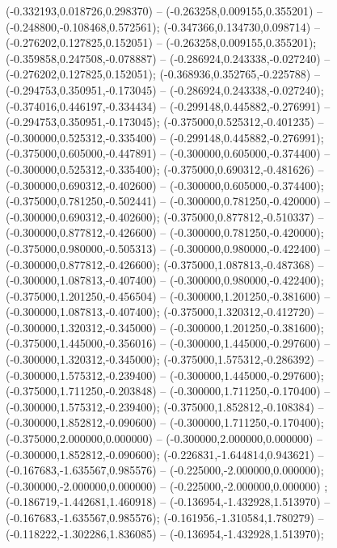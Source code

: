  (-0.332193,0.018726,0.298370) -- (-0.263258,0.009155,0.355201) -- (-0.248800,-0.108468,0.572561);
 (-0.347366,0.134730,0.098714) -- (-0.276202,0.127825,0.152051) -- (-0.263258,0.009155,0.355201);
 (-0.359858,0.247508,-0.078887) -- (-0.286924,0.243338,-0.027240) -- (-0.276202,0.127825,0.152051);
 (-0.368936,0.352765,-0.225788) -- (-0.294753,0.350951,-0.173045) -- (-0.286924,0.243338,-0.027240);
 (-0.374016,0.446197,-0.334434) -- (-0.299148,0.445882,-0.276991) -- (-0.294753,0.350951,-0.173045);
 (-0.375000,0.525312,-0.401235) -- (-0.300000,0.525312,-0.335400) -- (-0.299148,0.445882,-0.276991);
 (-0.375000,0.605000,-0.447891) -- (-0.300000,0.605000,-0.374400) -- (-0.300000,0.525312,-0.335400);
 (-0.375000,0.690312,-0.481626) -- (-0.300000,0.690312,-0.402600) -- (-0.300000,0.605000,-0.374400);
 (-0.375000,0.781250,-0.502441) -- (-0.300000,0.781250,-0.420000) -- (-0.300000,0.690312,-0.402600);
 (-0.375000,0.877812,-0.510337) -- (-0.300000,0.877812,-0.426600) -- (-0.300000,0.781250,-0.420000);
 (-0.375000,0.980000,-0.505313) -- (-0.300000,0.980000,-0.422400) -- (-0.300000,0.877812,-0.426600);
 (-0.375000,1.087813,-0.487368) -- (-0.300000,1.087813,-0.407400) -- (-0.300000,0.980000,-0.422400);
 (-0.375000,1.201250,-0.456504) -- (-0.300000,1.201250,-0.381600) -- (-0.300000,1.087813,-0.407400);
 (-0.375000,1.320312,-0.412720) -- (-0.300000,1.320312,-0.345000) -- (-0.300000,1.201250,-0.381600);
 (-0.375000,1.445000,-0.356016) -- (-0.300000,1.445000,-0.297600) -- (-0.300000,1.320312,-0.345000);
 (-0.375000,1.575312,-0.286392) -- (-0.300000,1.575312,-0.239400) -- (-0.300000,1.445000,-0.297600);
 (-0.375000,1.711250,-0.203848) -- (-0.300000,1.711250,-0.170400) -- (-0.300000,1.575312,-0.239400);
 (-0.375000,1.852812,-0.108384) -- (-0.300000,1.852812,-0.090600) -- (-0.300000,1.711250,-0.170400);
 (-0.375000,2.000000,0.000000) -- (-0.300000,2.000000,0.000000) -- (-0.300000,1.852812,-0.090600);
 (-0.226831,-1.644814,0.943621) -- (-0.167683,-1.635567,0.985576) -- (-0.225000,-2.000000,0.000000);
 (-0.300000,-2.000000,0.000000) -- (-0.225000,-2.000000,0.000000) ;
 (-0.186719,-1.442681,1.460918) -- (-0.136954,-1.432928,1.513970) -- (-0.167683,-1.635567,0.985576);
 (-0.161956,-1.310584,1.780279) -- (-0.118222,-1.302286,1.836085) -- (-0.136954,-1.432928,1.513970);
